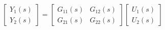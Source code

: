 \documentclass[preview]{standalone}
\begin{document}
\begin{align*}
\begin{bmatrix} Y_1(s) \\ Y_2(s) \end{bmatrix} =\begin{bmatrix} G_{11}(s) & G_{12}(s) \\ G_{21}(s) & G_{22}(s) \end{bmatrix}\begin{bmatrix} U_1(s) \\ U_2(s) \end{bmatrix}
\end{align*}
\end{document}
